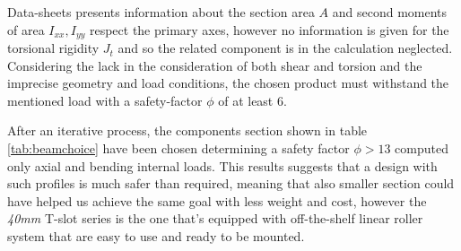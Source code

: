 	Data-sheets presents information about the section area $A$ and second moments of area $I_{xx},I_{yy}$ respect the primary axes, however no information is given for the torsional rigidity $J_t$ and so the related component is in the calculation neglected. Considering the lack in the consideration of both shear and torsion and the imprecise geometry and load conditions, the chosen product must withstand the mentioned load with a safety-factor $\phi$ of at least 6.
	
	After an iterative process, the components section shown in table \ref{tab:beamchoice} have been chosen determining a safety factor $\phi > 13$ computed only axial and bending internal loads. This results suggests that a design with such profiles is much safer than required, meaning that also smaller section could have helped us achieve the same goal with less weight and cost, however the \textit{40mm} T-slot series is the one that's equipped with off-the-shelf linear roller system that are easy to use and ready to be mounted.
	
	
	
	

	
	
	
	
	
	
	
	
	
	
	
	
	
	
	
	
	
	
	
	
	
	
	
	
	
	
	
	
	
	
	
	